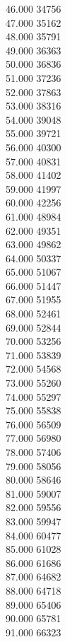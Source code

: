 { 46.000	34756 \\
 47.000	35162 \\
 48.000	35791 \\
 49.000	36363 \\
 50.000	36836 \\
 51.000	37236 \\
 52.000	37863 \\
 53.000	38316 \\
 54.000	39048 \\
 55.000	39721 \\
 56.000	40300 \\
 57.000	40831 \\
 58.000	41402 \\
 59.000	41997 \\
 60.000	42256 \\
 61.000	48984 \\
 62.000	49351 \\
 63.000	49862 \\
 64.000	50337 \\
 65.000	51067 \\
 66.000	51447 \\
 67.000	51955 \\
 68.000	52461 \\
 69.000	52844 \\
 70.000	53256 \\
 71.000	53839 \\
 72.000	54568 \\
 73.000	55260 \\
 74.000	55297 \\
 75.000	55838 \\
 76.000	56509 \\
 77.000	56980 \\
 78.000	57406 \\
 79.000	58056 \\
 80.000	58646 \\
 81.000	59007 \\
 82.000	59556 \\
 83.000	59947 \\
 84.000	60477 \\
 85.000	61028 \\
 86.000	61686 \\
 87.000	64682 \\
 88.000	64718 \\
 89.000	65406 \\
 90.000	65781 \\
 91.000	66323 \\
}
